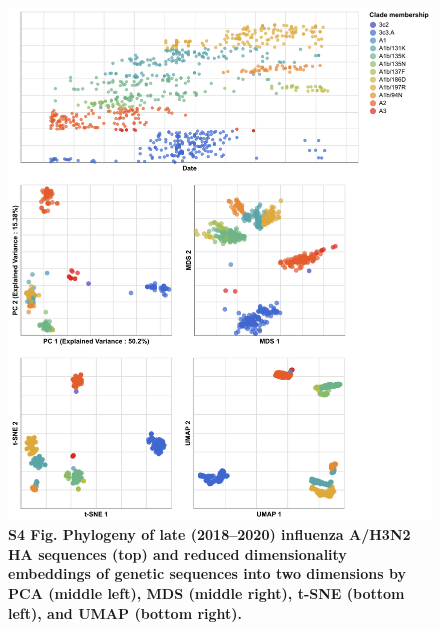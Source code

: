 \documentclass[10pt,letterpaper]{article}
\begin{document}
\begin{figure}[!h]
\includegraphics[width=\columnwidth]{figures/flu-2018-2020-ha-embeddings-by-clade.png}
\caption*{{\bf S4 Fig. Phylogeny of late (2018--2020) influenza A/H3N2 HA sequences (top) and reduced dimensionality embeddings of genetic sequences into two dimensions by PCA (middle left), MDS (middle right), t-SNE (bottom left), and UMAP (bottom right).}}
\end{figure}
\end{document}
